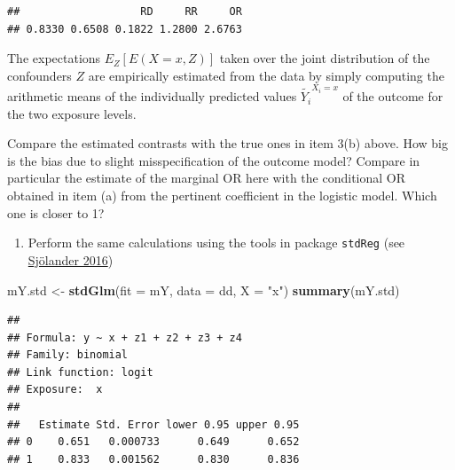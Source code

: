 \documentclass[
]{book}
\newenvironment{Shaded}{\begin{snugshade}}{\end{snugshade}}
\newcommand{\AttributeTok}[1]{\textcolor[rgb]{0.13,0.29,0.53}{#1}}
\newcommand{\DecValTok}[1]{\textcolor[rgb]{0.00,0.00,0.81}{#1}}
\newcommand{\FunctionTok}[1]{\textcolor[rgb]{0.13,0.29,0.53}{\textbf{#1}}}
\newcommand{\NormalTok}[1]{#1}
\newcommand{\OtherTok}[1]{\textcolor[rgb]{0.56,0.35,0.01}{#1}}
\newcommand{\SpecialCharTok}[1]{\textcolor[rgb]{0.81,0.36,0.00}{\textbf{#1}}}
\newcommand{\StringTok}[1]{\textcolor[rgb]{0.31,0.60,0.02}{#1}}
\providecommand{\tightlist}{%
  \setlength{\itemsep}{0pt}\setlength{\parskip}{0pt}}
\begin{document}
\begin{Shaded}
\end{Shaded}

\begin{verbatim}
##                   RD     RR     OR 
## 0.8330 0.6508 0.1822 1.2800 2.6763
\end{verbatim}

The expectations \(E_Z[E(X=x, Z)]\) taken over the joint distribution of
the confounders \(Z\) are empirically estimated from the data by simply
computing the arithmetic means of the individually predicted values
\(\widetilde{Y_i}^{X_i=x}\) of the outcome for the two exposure levels.

Compare the estimated contrasts with the true ones in item 3(b) above.
How big is the bias due to slight misspecification of the outcome model?
Compare in particular the estimate of the marginal OR here with the
conditional OR obtained in item (a) from the pertinent coefficient in
the logistic model. Which one is closer to 1?

\begin{enumerate}
\def\labelenumi{\arabic{enumi}.}
\setcounter{enumi}{3}
\tightlist
\item
  Perform the same calculations using the tools in package \texttt{stdReg}
  (see \href{https://doi.org/10.1007/s10654-016-0157-3}{Sjölander 2016})
\end{enumerate}

\begin{Shaded}
\begin{Highlighting}[]
\NormalTok{mY.std }\OtherTok{\textless{}{-}} \FunctionTok{stdGlm}\NormalTok{(}\AttributeTok{fit =}\NormalTok{ mY, }\AttributeTok{data =}\NormalTok{ dd, }\AttributeTok{X =} \StringTok{"x"}\NormalTok{)}
\FunctionTok{summary}\NormalTok{(mY.std)}
\end{Highlighting}
\end{Shaded}

\begin{verbatim}
## 
## Formula: y ~ x + z1 + z2 + z3 + z4
## Family: binomial 
## Link function: logit 
## Exposure:  x 
## 
##   Estimate Std. Error lower 0.95 upper 0.95
## 0    0.651   0.000733      0.649      0.652
## 1    0.833   0.001562      0.830      0.836
\end{verbatim}
\end{document}
